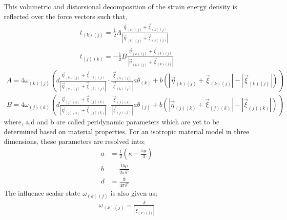 \documentclass[10pt,a4paper,onecolumn]{article}
\begin{document}
This volumetric and distorsional decomposition of the strain energy density is reflected over the force vectors such that,
\begin{align}
t_{(k)(j)} = \frac{1}{2} A \frac{\vec{\eta}_{(k)(j)}+\vec{\xi}_{(k)(j)}}{|\vec{\eta}_{(k)(j)}+\vec{\xi}_{(k)(j)}|}\\
t_{(j)(k)} = -\frac{1}{2} B \frac{\vec{\eta}_{(k)(j)}+\vec{\xi}_{(k)(j)}}{|\vec{\eta}_{(k)(j)}+\vec{\xi}_{(k)(j)}|}
\end{align}
\begin{align}
\label{eq:A}
A = 4\omega_{(k)(j)}\left(d \frac{\vec{\eta}_{(k)(j)}+\vec{\xi}_{(k)(j)}}{|\vec{\eta}_{(k)(j)}+\vec{\xi}_{(k)(j)}|}\cdot\frac{\vec{\xi}_{(k)(j)}}{|\vec{\xi}_{(k)(j)}|}a\theta_{(k)}+ b \left( |\vec{\eta}_{(k)(j)}+\vec{\xi}_{(k)(j)}|-|\vec{\xi}_{(k)(j)}|\right)\right)\\
\label{eq:B}
B = 4\omega_{(j)(k)}\left(d \frac{\vec{\eta}_{(j)(k)}+\vec{\xi}_{(j)(k)}}{|\vec{\eta}_{(j)(k)}+\vec{\xi}_{(j)(k)}|}\cdot\frac{\vec{\xi}_{(j)(k)}}{|\vec{\xi}_{(j)(k)}|}a\theta_{(j)}+ b \left( |\vec{\eta}_{(j)(k)}+\vec{\xi}_{(j)(k)}|-|\vec{\xi}_{(j)(k)}|\right)\right)
\end{align}
where, a,d and b are called peridynamic parameters which are yet to be determined based on material properties. For an isotropic material model in three dimensions, these parameters are resolved into; 
\begin{align}
a &= \frac{1}{2}(\kappa - \frac{5\mu}{3})\\
b &= \frac{15\mu}{2\pi\delta^5}\\
d &= \frac{9}{4\pi\delta^4}
\end{align}
The influence scalar state $\omega_{(k)(j)}$ is also given as;
\begin{align}
\omega_{(k)(j)} = \frac{\delta}{|\xi_{(k)(j)}|}
\end{align}
\end{document}
